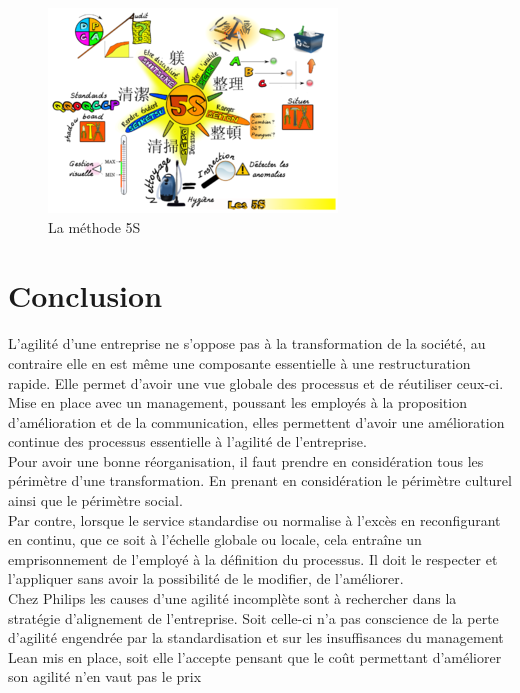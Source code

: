 \documentclass[12pt,a4paper]{article}
\begin{document}
\begin{figure}[h!]
\centering
\includegraphics[scale=1]{Carte_5S}
\caption{La méthode 5S}
\label{fig:5s}
\end{figure}


\newpage
\part{Conclusion}

L'agilité d'une entreprise ne s’oppose pas à la transformation de la société, au contraire elle en est même une composante essentielle à une restructuration rapide. Elle permet d’avoir une vue globale des processus et de réutiliser ceux-ci. Mise en place avec un management, poussant les employés à la proposition d’amélioration et de la communication, elles permettent d’avoir une amélioration continue des processus essentielle à l’agilité de l’entreprise.\\

Pour avoir une bonne réorganisation, il faut prendre en considération tous les périmètre d'une transformation. En prenant en considération le périmètre culturel ainsi que le périmètre social.\\

Par contre, lorsque le service standardise ou normalise à l'excès en reconfigurant en continu, que ce soit à l’échelle globale ou locale, cela entraîne un emprisonnement de l’employé à la définition du processus. Il doit le respecter et l’appliquer sans avoir la possibilité de le modifier, de l’améliorer. \\

Chez Philips les causes d’une agilité incomplète sont à rechercher dans la stratégie d’alignement de l’entreprise. Soit celle-ci n’a pas conscience  de la perte d’agilité engendrée par la standardisation et sur les insuffisances du management Lean mis en place, soit elle l’accepte pensant que le coût permettant d’améliorer son agilité n’en vaut pas le prix\\
\end{document}
